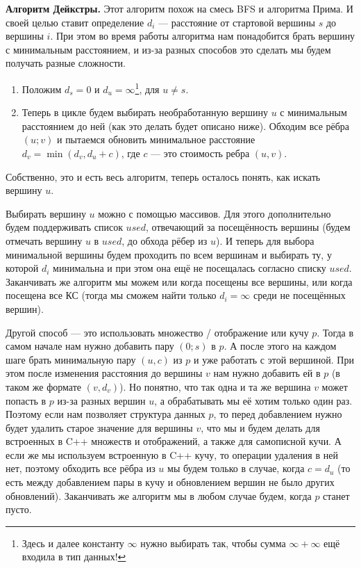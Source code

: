 \textbf{Алгоритм Дейкстры.} Этот алгоритм похож на смесь BFS и алгоритма Прима. И своей целью ставит определение $d_i$ — расстояние от стартовой вершины $s$ до вершины $i$. При этом во время работы алгоритма нам понадобится брать вершину с минимальным расстоянием, и из-за разных способов это сделать мы будем получать разные сложности.

\begin{enumerate}
    \item Положим $d_s = 0$ и $d_u = \infty$\footnote{Здесь и далее константу $\infty$ нужно выбирать так, чтобы сумма $\infty + \infty$ ещё входила в тип данных!}, для $u \ne s$.
    \item Теперь в цикле будем выбирать необработанную вершину $u$ с минимальным расстоянием до ней (как это делать будет описано ниже). Обходим все рёбра $(u; v)$ и пытаемся обновить минимальное расстояние $d_v = \min(d_v, d_u + c)$, где $c$ — это стоимость ребра $(u, v)$.
\end{enumerate}

Собственно, это и есть весь алгоритм, теперь осталось понять, как искать вершину $u$.

Выбирать вершину $u$ можно с помощью массивов. Для этого дополнительно будем поддерживать список $used$, отвечающий за посещённость вершины (будем отмечать вершину $u$ в $used$, до обхода рёбер из $u$). И теперь для выбора минимальной вершины будем проходить по всем вершинам и выбирать ту, у которой $d_i$ минимальна и при этом она ещё не посещалась согласно списку $used$. Заканчивать же алгоритм мы можем или когда посещены все вершины, или когда посещена все КС (тогда мы сможем найти только $d_i = \infty$ среди не посещённых вершин).

Другой способ — это использовать множество / отображение или кучу $p$. Тогда в самом начале нам нужно добавить пару $(0; s)$ в $p$. А после этого на каждом шаге брать минимальную пару $(u, c)$ из $p$ и уже работать с этой вершиной. При этом после изменения расстояния до вершины $v$ нам нужно добавить ей в $p$ (в таком же формате $(v, d_v)$). Но понятно, что так одна и та же вершина $v$ может попасть в $p$ из-за разных вершин $u$, а обрабатывать мы её хотим только один раз. Поэтому если нам позволяет структура данных $p$, то перед добавлением нужно будет удалить старое значение для вершины $v$, что мы и будем делать для встроенных в C++ множеств и отображений, а также для самописной кучи. А если же мы используем встроенную в C++ кучу, то операции удаления в ней нет, поэтому обходить все рёбра из $u$ мы будем только в случае, когда $c = d_u$ (то есть между добавлением пары в кучу и обновлением вершин не было других обновлений). Заканчивать же алгоритм мы в любом случае будем, когда $p$ станет пусто.

